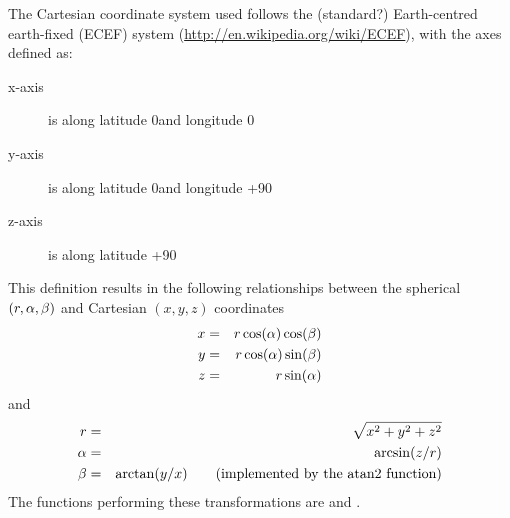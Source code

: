 The Cartesian coordinate system used follows the (standard?) Earth-centred
earth-fixed (ECEF) system (\url{http://en.wikipedia.org/wiki/ECEF}), with the
axes defined as:
\begin{description}
\item[x-axis] is along latitude 0\degree and longitude 0\degree
\item[y-axis] is along latitude 0\degree and longitude +90\degree
\item[z-axis] is along latitude +90\degree
\end{description}
This definition results in the following relationships between the
spherical $(r,\alpha,\beta)$ and Cartesian $(x,y,z)$ coordinates
\begin{eqnarray}
  x &=& r \cos(\alpha) \cos(\beta) \nonumber \\
  y &=& r \cos(\alpha) \sin(\beta) \\
  z &=& r \sin(\alpha)            \nonumber
 \label{eq:ppath:sph2cart}
\end{eqnarray}
and
\begin{eqnarray}
 \label{eq:ppath:cart2sph}
  \Rds &=& \sqrt{x^2+y^2+z^2}  \nonumber  \\
  \Lat &=& \arcsin(z/\Rds)                \\
  \Lon &=& \arctan(y/x) \qquad \mathrm{(implemented\ by\ the\ atan2\ function)}
                               \nonumber
\end{eqnarray}
The functions performing these transformations are  and
.

